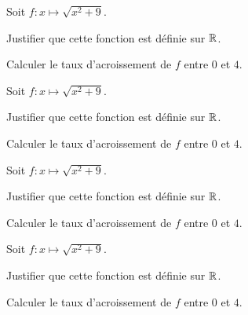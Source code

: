 \documentclass{exos}
\begin{document}
\begin{exercize*}
Soit $f \colon x \mapsto \sqrt{x^2 + 9}$.
\begin{alphaquestions}
\item Justifier que cette fonction est définie sur $\mathbb{R}$.
\item Calculer le taux d'acroissement de $f$ entre $0$ et $4$. 
\end{alphaquestions}
\end{exercize*}
\vspace*{3cm}
\begin{exercize*}
Soit $f \colon x \mapsto \sqrt{x^2 + 9}$.
\begin{alphaquestions}
\item Justifier que cette fonction est définie sur $\mathbb{R}$.
\item Calculer le taux d'acroissement de $f$ entre $0$ et $4$. 
\end{alphaquestions}
\end{exercize*}
\vspace*{3cm}
\begin{exercize*}
Soit $f \colon x \mapsto \sqrt{x^2 + 9}$.
\begin{alphaquestions}
\item Justifier que cette fonction est définie sur $\mathbb{R}$.
\item Calculer le taux d'acroissement de $f$ entre $0$ et $4$. 
\end{alphaquestions}
\end{exercize*}
\vspace*{3cm}
\begin{exercize*}
Soit $f \colon x \mapsto \sqrt{x^2 + 9}$.
\begin{alphaquestions}
\item Justifier que cette fonction est définie sur $\mathbb{R}$.
\item Calculer le taux d'acroissement de $f$ entre $0$ et $4$. 
\end{alphaquestions}
\end{exercize*}
\vspace*{3cm}
\end{document}
